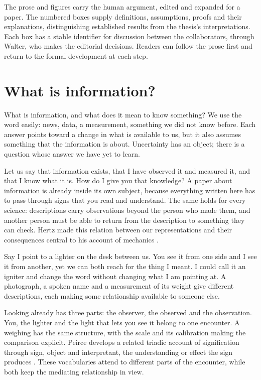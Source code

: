 \documentclass[11pt,a4paper]{article}
\begin{document}
The prose and figures carry the human argument, edited and expanded for a paper.
The numbered boxes supply definitions, assumptions, proofs and their explanations,
distinguishing established results from the thesis's interpretations. Each box
has a stable identifier for discussion between the collaborators, through Walter,
who makes the editorial decisions. Readers can follow the prose first and return
to the formal development at each step.

\tableofcontents
\newpage

\section{What is information?}
\label{sec:question}

What is information, and what does it mean to know something? We use the word
easily: news, data, a measurement, something we did not know before. Each answer
points toward a change in what is available to us, but it also assumes something
that the information is about. Uncertainty has an object; there is a question
whose answer we have yet to learn.

Let us say that information exists, that I have observed it and measured it,
and that I know what it is. How do I give you that knowledge? A paper about
information is already inside its own subject, because everything written here
has to pass through signs that you read and understand. The same holds for every
science: descriptions carry observations beyond the person who made them, and
another person must be able to return from the description to something they
can check. Hertz made this relation between our representations and their
consequences central to his account of mechanics \citep{Hertz1899}.

Say I point to a lighter on the desk between us. You see it from one side and I
see it from another, yet we can both reach for the thing I meant. I could call
it an igniter and change the word without changing what I am pointing at. A
photograph, a spoken name and a measurement of its weight give different
descriptions, each making some relationship available to someone else.

Looking already has three parts: the observer, the observed and the
observation. You, the lighter and the light that lets you see it belong to one
encounter. A weighing has the same structure, with the scale and its calibration
making the comparison explicit. Peirce develops a related triadic account of
signification through sign, object and interpretant, the understanding or effect
the sign produces \citep{Peirce1904}. These vocabularies attend to different parts
of the encounter, while both keep the mediating relationship in view.
\end{document}
